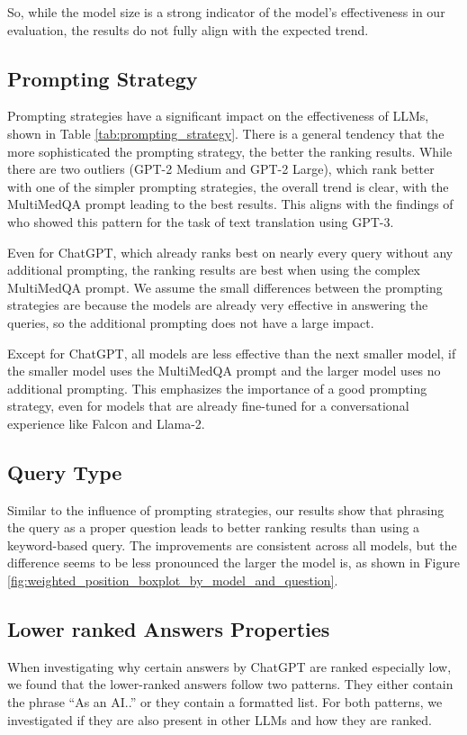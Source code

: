 So, while the model size is a strong indicator of the model's effectiveness in our evaluation, the results do not fully align with the expected trend.

\subsection{Prompting Strategy}
Prompting strategies have a significant impact on the effectiveness of LLMs, shown in Table \ref{tab:prompting_strategy}.
There is a general tendency that the more sophisticated the prompting strategy, the better the ranking results.
While there are two outliers (GPT-2 Medium and GPT-2 Large), which rank better with one of the simpler prompting strategies, the overall trend is clear, with the MultiMedQA prompt leading to the best results.
This aligns with the findings of \cite{reynolds:2021:Prompt} who showed this pattern for the task of text translation using GPT-3.

Even for ChatGPT, which already ranks best on nearly every query without any additional prompting, the ranking results are best when using the complex MultiMedQA prompt.
We assume the small differences between the prompting strategies are because the models are already very effective in answering the queries, so the additional prompting does not have a large impact.

Except for ChatGPT, all models are less effective than the next smaller model, if the smaller model uses the MultiMedQA prompt and the larger model uses no additional prompting.
This emphasizes the importance of a good prompting strategy, even for models that are already fine-tuned for a conversational experience like Falcon and Llama-2.

\subsection{Query Type}
Similar to the influence of prompting strategies, our results show that phrasing the query as a proper question leads to better ranking results than using a keyword-based query.
The improvements are consistent across all models, but the difference seems to be less pronounced the larger the model is, as shown in Figure \ref{fig:weighted_position_boxplot_by_model_and_question}.

\subsection{Lower ranked Answers Properties}
When investigating why certain answers by ChatGPT are ranked especially low, we found that the lower-ranked answers follow two patterns.
They either contain the phrase ``As an AI..'' or they contain a formatted list.
For both patterns, we investigated if they are also present in other LLMs and how they are ranked.


